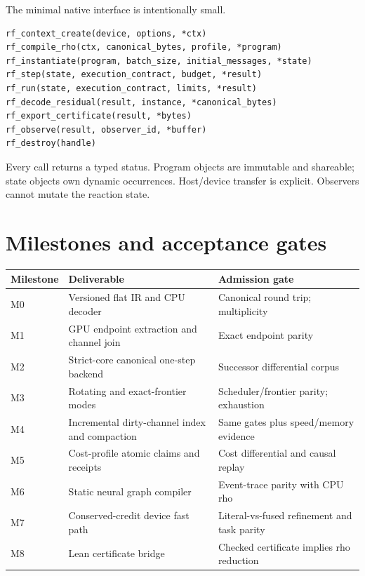 \documentclass[11pt]{article}
\begin{document}
The minimal native interface is intentionally small.

\begin{verbatim}
rf_context_create(device, options, *ctx)
rf_compile_rho(ctx, canonical_bytes, profile, *program)
rf_instantiate(program, batch_size, initial_messages, *state)
rf_step(state, execution_contract, budget, *result)
rf_run(state, execution_contract, limits, *result)
rf_decode_residual(result, instance, *canonical_bytes)
rf_export_certificate(result, *bytes)
rf_observe(result, observer_id, *buffer)
rf_destroy(handle)
\end{verbatim}

Every call returns a typed status.  Program objects are immutable and
shareable; state objects own dynamic occurrences.  Host/device transfer is
explicit.  Observers cannot mutate the reaction state.

\section{Milestones and acceptance gates}

\begin{center}
\begin{tabularx}{\textwidth}{@{}l X X@{}}
\toprule
Milestone & Deliverable & Admission gate\\
\midrule
M0 & Versioned flat IR and CPU decoder & Canonical round trip; multiplicity\\
M1 & GPU endpoint extraction and channel join & Exact endpoint parity\\
M2 & Strict-core canonical one-step backend & Successor differential corpus\\
M3 & Rotating and exact-frontier modes & Scheduler/frontier parity; exhaustion\\
M4 & Incremental dirty-channel index and compaction & Same gates plus speed/memory evidence\\
M5 & Cost-profile atomic claims and receipts & Cost differential and causal replay\\
M6 & Static neural graph compiler & Event-trace parity with CPU rho\\
M7 & Conserved-credit device fast path & Literal-vs-fused refinement and task parity\\
M8 & Lean certificate bridge & Checked certificate implies rho reduction\\
\bottomrule
\end{tabularx}
\end{center}
\end{document}
